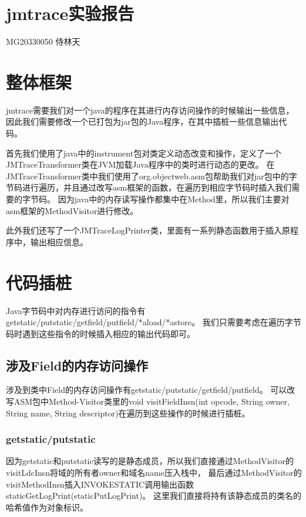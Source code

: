 \documentclass[UTF8]{article}
\begin{document}
\section*{jmtrace实验报告}
MG20330050 侍林天
\section{整体框架}
jmtrace需要我们对一个java的程序在其进行内存访问操作的时候输出一些信息，因此我们需要修改一个已打包为jar包的Java程序，在其中插桩一些信息输出代码。

首先我们使用了java中的instrument包对类定义动态改变和操作，定义了一个JMTraceTransformer类在JVM加载Java程序中的类时进行动态的更改。
在JMTraceTransformer类中我们使用了org.objectweb.asm包帮助我们对jar包中的字节码进行遍历，并且通过改写asm框架的函数，在遍历到相应字节码时插入我们需要的字节码。
因为java中的内存读写操作都集中在Method里，所以我们主要对asm框架的MethodVisitor进行修改。

此外我们还写了一个JMTraceLogPrinter类，里面有一系列静态函数用于插入原程序中，输出相应信息。

\section{代码插桩}
Java字节码中对内存进行访问的指令有getstatic/putstatic/getfield/putfield/*aload/*astore。
我们只需要考虑在遍历字节码时遇到这些指令的时候插入相应的输出代码即可。

\subsection{涉及Field的内存访问操作}
涉及到类中Field的内存访问操作有getstatic/putstatic/getfield/putfield。
可以改写ASM包中Method-Visitor类里的void visitFieldInsn(int opcode, String owner, String name, String descriptor)在遍历到这些操作的时候进行插桩。

\subsubsection{getstatic/putstatic}
因为getstatic和putstatic读写的是静态成员，所以我们直接通过MethodVisitor的visitLdcInsn将域的所有者owner和域名name压入栈中，
最后通过MethodVisitor的visitMethodInsn插入INVOKESTATIC调用输出函数staticGetLogPrint(staticPutLogPrint)。
这里我们直接将持有该静态成员的类名的哈希值作为对象标识。
\end{document}
